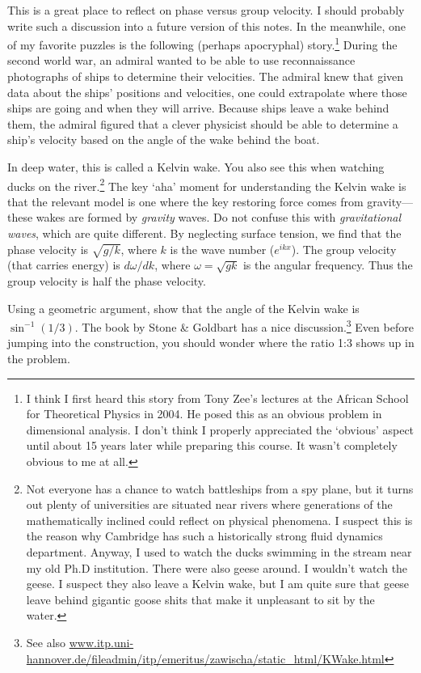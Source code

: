 \begin{exercise}
This is a great place to reflect on phase versus group velocity. I should probably write such a discussion into a future version of this notes.  In the meanwhile, one of my favorite puzzles is the following (perhaps apocryphal) story.\footnote{I think I first heard this story from Tony Zee's lectures at the African School for Theoretical Physics in 2004. He posed this as an obvious problem in dimensional analysis. I don't think I properly appreciated the `obvious' aspect until about 15 years later while preparing this course. It wasn't completely obvious to me at all.} During the second world war, an admiral wanted to be able to use reconnaissance photographs of ships to determine their velocities. The admiral knew that given data about the ships' positions and velocities, one could extrapolate where those ships are going and when they will arrive. Because ships leave a wake behind them, the admiral figured that a clever physicist should be able to determine a ship's velocity based on the angle of the wake behind the boat.

In deep water, this is called a Kelvin wake. You also see this when watching ducks on the river.\footnote{Not everyone has a chance to watch battleships from a spy plane, but it turns out plenty of universities are situated near rivers where generations of the mathematically inclined could reflect on physical phenomena. I suspect this is the reason why Cambridge has such a historically strong fluid dynamics department. Anyway, I used to watch the ducks swimming in the stream near my old Ph.D institution. There were also geese around. I wouldn't watch the geese. I suspect they also leave a Kelvin wake, but I am quite sure that geese leave behind gigantic goose shits that make it unpleasant to sit by the water.} The key `aha' moment for understanding the Kelvin wake is that the relevant model is one where the key restoring force comes from gravity---these wakes are formed by \emph{gravity} waves. Do not confuse this with \emph{gravitational waves}, which are quite different. By neglecting surface tension, we find that the phase velocity is $\sqrt{g/k}$, where $k$ is the wave number ($e^{ikx}$). The group velocity (that carries energy) is $d\omega/dk$, where $\omega=\sqrt{gk}$ is the angular frequency. Thus the group velocity is half the phase velocity. 

Using a geometric argument, show that the angle of the Kelvin wake is $\sin^{-1}(1/3)$. The book by Stone \& Goldbart has a nice discussion.\footnote{See also \url{www.itp.uni-hannover.de/fileadmin/itp/emeritus/zawischa/static_html/KWake.html}} Even before jumping into the construction, you should wonder where the ratio 1:3 shows up in the problem. 
\end{exercise}

